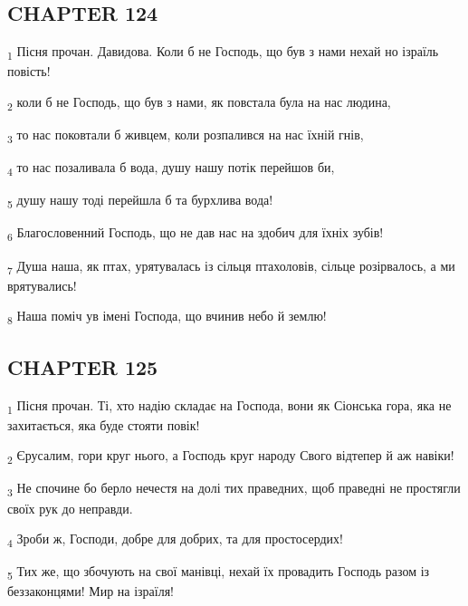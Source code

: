 \subsection{CHAPTER 124}
\begin{tcolorbox}
\textsubscript{1} Пісня прочан. Давидова. Коли б не Господь, що був з нами нехай но ізраїль повість!
\end{tcolorbox}
\begin{tcolorbox}
\textsubscript{2} коли б не Господь, що був з нами, як повстала була на нас людина,
\end{tcolorbox}
\begin{tcolorbox}
\textsubscript{3} то нас поковтали б живцем, коли розпалився на нас їхній гнів,
\end{tcolorbox}
\begin{tcolorbox}
\textsubscript{4} то нас позаливала б вода, душу нашу потік перейшов би,
\end{tcolorbox}
\begin{tcolorbox}
\textsubscript{5} душу нашу тоді перейшла б та бурхлива вода!
\end{tcolorbox}
\begin{tcolorbox}
\textsubscript{6} Благословенний Господь, що не дав нас на здобич для їхніх зубів!
\end{tcolorbox}
\begin{tcolorbox}
\textsubscript{7} Душа наша, як птах, урятувалась із сільця птахоловів, сільце розірвалось, а ми врятувались!
\end{tcolorbox}
\begin{tcolorbox}
\textsubscript{8} Наша поміч ув імені Господа, що вчинив небо й землю!
\end{tcolorbox}
\subsection{CHAPTER 125}
\begin{tcolorbox}
\textsubscript{1} Пісня прочан. Ті, хто надію складає на Господа, вони як Сіонська гора, яка не захитається, яка буде стояти повік!
\end{tcolorbox}
\begin{tcolorbox}
\textsubscript{2} Єрусалим, гори круг нього, а Господь круг народу Свого відтепер й аж навіки!
\end{tcolorbox}
\begin{tcolorbox}
\textsubscript{3} Не спочине бо берло нечестя на долі тих праведних, щоб праведні не простягли своїх рук до неправди.
\end{tcolorbox}
\begin{tcolorbox}
\textsubscript{4} Зроби ж, Господи, добре для добрих, та для простосердих!
\end{tcolorbox}
\begin{tcolorbox}
\textsubscript{5} Тих же, що збочують на свої манівці, нехай їх провадить Господь разом із беззаконцями! Мир на ізраїля!
\end{tcolorbox}
